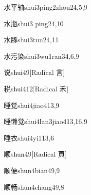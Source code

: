 \begin{entry}{水平轴}{shui3ping2zhou2}{4,5,9}
\end{entry}

\begin{entry}{水瓶}{shui3 ping2}{4,10}
\end{entry}

\begin{entry}{水豚}{shui3tun2}{4,11}
\end{entry}

\begin{entry}{水污染}{shui3wu1ran3}{4,6,9}
\end{entry}

\begin{entry}{说}{shui4}{9}[Radical 言]
\end{entry}

\begin{entry}{税}{shui4}{12}[Radical 禾]
\end{entry}

\begin{entry}{睡觉}{shui4jiao4}{13,9}
\end{entry}

\begin{entry}{睡懒觉}{shui4lan3jiao4}{13,16,9}
\end{entry}

\begin{entry}{睡衣}{shui4yi1}{13,6}
\end{entry}

\begin{entry}{顺}{shun4}{9}[Radical 頁]
\end{entry}

\begin{entry}{顺便}{shun4bian4}{9,9}
\end{entry}

\begin{entry}{顺畅}{shun4chang4}{9,8}
\end{entry}

